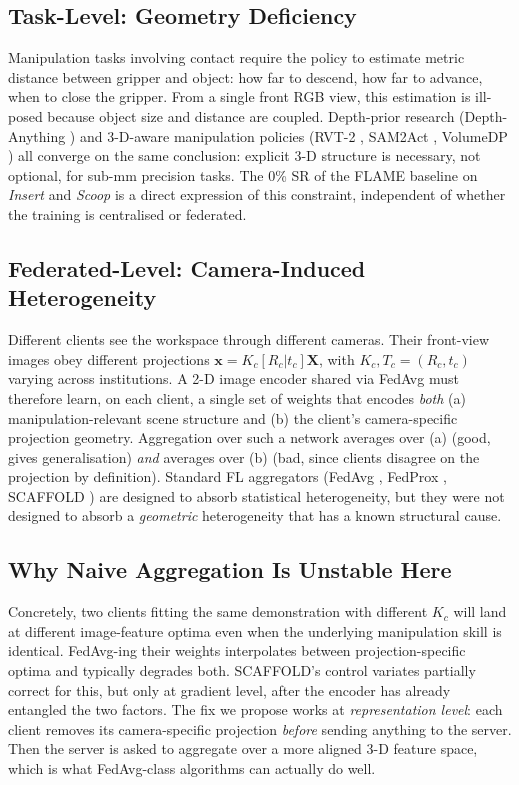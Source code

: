\documentclass{article}
\begin{document}
\subsection{Task-Level: Geometry Deficiency}
\label{sec:problem-task}
Manipulation tasks involving contact require the policy to estimate
metric distance between gripper and object: how far to descend, how
far to advance, when to close the gripper. From a single front
RGB view, this estimation is ill-posed because object size and
distance are coupled. Depth-prior research (Depth-Anything
\cite{depthanything}) and 3-D-aware manipulation policies (RVT-2
\cite{rvt2}, SAM2Act \cite{sam2act}, VolumeDP \cite{volumedp2026})
all converge on the same conclusion: explicit 3-D structure is
necessary, not optional, for sub-mm precision tasks. The 0\% SR of
the FLAME baseline on \emph{Insert} and \emph{Scoop} is a direct
expression of this constraint, independent of whether the training
is centralised or federated.

\subsection{Federated-Level: Camera-Induced Heterogeneity}
\label{sec:problem-fl}
Different clients see the workspace through different cameras.
Their front-view images obey different projections
$\mathbf{x} = K_c[R_c|t_c]\mathbf{X}$, with $K_c, T_c\!=\!(R_c,t_c)$
varying across institutions. A 2-D image encoder shared via FedAvg
must therefore learn, on each client, a single set of weights that
encodes \emph{both} (a) manipulation-relevant scene structure and
(b) the client's camera-specific projection geometry. Aggregation
over such a network averages over (a) (good, gives generalisation)
\emph{and} averages over (b) (bad, since clients disagree on the
projection by definition). Standard FL aggregators
(FedAvg \cite{fedavg}, FedProx \cite{fedprox}, SCAFFOLD
\cite{scaffold}) are designed to absorb statistical
heterogeneity, but they were not designed to absorb a
\emph{geometric} heterogeneity that has a known structural cause.

\subsection{Why Naive Aggregation Is Unstable Here}
\label{sec:problem-naive}
Concretely, two clients fitting the same demonstration with
different $K_c$ will land at different image-feature optima even
when the underlying manipulation skill is identical. FedAvg-ing
their weights interpolates between projection-specific optima and
typically degrades both. SCAFFOLD's control variates partially
correct for this, but only at gradient level, after the encoder has
already entangled the two factors. The fix we propose works at
\emph{representation level}: each client removes its
camera-specific projection \emph{before} sending anything to the
server. Then the server is asked to aggregate over a more aligned
3-D feature space, which is what FedAvg-class algorithms can
actually do well.
\end{document}
